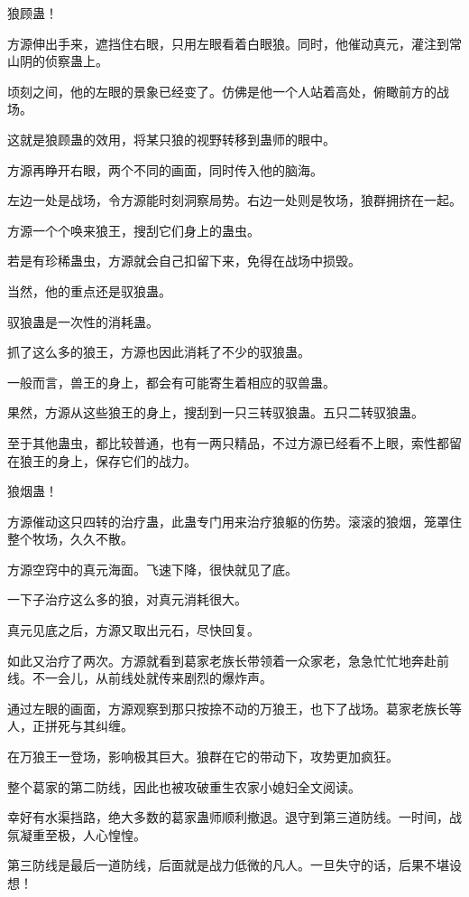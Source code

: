 \begin{this_body}
狼顾蛊！

方源伸出手来，遮挡住右眼，只用左眼看着白眼狼。同时，他催动真元，灌注到常山阴的侦察蛊上。

顷刻之间，他的左眼的景象已经变了。仿佛是他一个人站着高处，俯瞰前方的战场。

这就是狼顾蛊的效用，将某只狼的视野转移到蛊师的眼中。

方源再睁开右眼，两个不同的画面，同时传入他的脑海。

左边一处是战场，令方源能时刻洞察局势。右边一处则是牧场，狼群拥挤在一起。

方源一个个唤来狼王，搜刮它们身上的蛊虫。

若是有珍稀蛊虫，方源就会自己扣留下来，免得在战场中损毁。

当然，他的重点还是驭狼蛊。

驭狼蛊是一次性的消耗蛊。

抓了这么多的狼王，方源也因此消耗了不少的驭狼蛊。

一般而言，兽王的身上，都会有可能寄生着相应的驭兽蛊。

果然，方源从这些狼王的身上，搜刮到一只三转驭狼蛊。五只二转驭狼蛊。

至于其他蛊虫，都比较普通，也有一两只精品，不过方源已经看不上眼，索性都留在狼王的身上，保存它们的战力。

狼烟蛊！

方源催动这只四转的治疗蛊，此蛊专门用来治疗狼躯的伤势。滚滚的狼烟，笼罩住整个牧场，久久不散。

方源空窍中的真元海面。飞速下降，很快就见了底。

一下子治疗这么多的狼，对真元消耗很大。

真元见底之后，方源又取出元石，尽快回复。

如此又治疗了两次。方源就看到葛家老族长带领着一众家老，急急忙忙地奔赴前线。不一会儿，从前线处就传来剧烈的爆炸声。

通过左眼的画面，方源观察到那只按捺不动的万狼王，也下了战场。葛家老族长等人，正拼死与其纠缠。

在万狼王一登场，影响极其巨大。狼群在它的带动下，攻势更加疯狂。

整个葛家的第二防线，因此也被攻破重生农家小媳妇全文阅读。

幸好有水渠挡路，绝大多数的葛家蛊师顺利撤退。退守到第三道防线。一时间，战氛凝重至极，人心惶惶。

第三防线是最后一道防线，后面就是战力低微的凡人。一旦失守的话，后果不堪设想！


\end{this_body}

